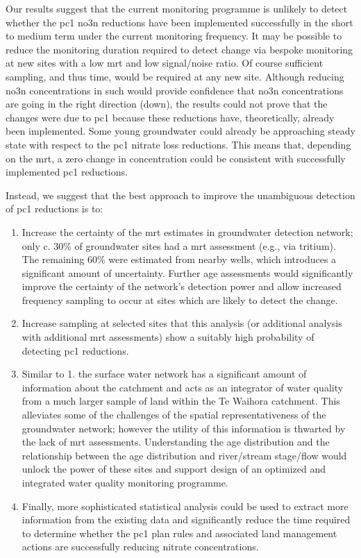 Our results suggest that the current monitoring programme is unlikely to detect whether the \gls{pc1} \gls{no3n} reductions have been implemented successfully in the short to medium term under the current monitoring frequency.
It may be possible to reduce the monitoring duration required to detect change via bespoke monitoring at new sites with a low \gls{mrt} and low signal/noise ratio.
Of course sufficient sampling, and thus time, would be required at any new site.
Although reducing \gls{no3n} concentrations in such would provide confidence that \gls{no3n} concentrations are going in the right direction (down), the results could not prove that the changes were due to \gls{pc1} because these reductions have, theoretically, already been implemented.
Some young groundwater could already be approaching steady state with respect to the \gls{pc1} nitrate loss reductions.
This means that, depending on the \gls{mrt}, a zero change in concentration could be consistent with successfully implemented \gls{pc1} reductions.

Instead, we suggest that the best approach to improve the unambiguous detection of \gls{pc1} reductions is to:
\begin{enumerate}
    \item Increase the certainty of the \gls{mrt} estimates in groundwater detection network; only c. 30\% of groundwater sites had a \gls{mrt} assessment (e.g., via tritium). The remaining 60\% were estimated from nearby wells, which introduces a significant amount of uncertainty. Further age assessments would significantly improve the certainty of the network's detection power and allow increased frequency sampling to occur at sites which are likely to detect the change.
    \item Increase sampling at selected sites that this analysis (or additional analysis with additional \gls{mrt} assessments) show a suitably high probability of detecting \gls{pc1} reductions.
    \item Similar to 1. the surface water network has a significant amount of information about the catchment and acts as an integrator of water quality from a much larger sample of land within the Te Waihora catchment. This alleviates some of the challenges of the spatial representativeness of the groundwater network\citep{olw_guidance}; however the utility of this information is thwarted by the lack of \gls{mrt} assessments. Understanding the age distribution and the relationship between the age distribution and river/stream stage/flow would unlock the power of these sites and support design of an optimized and integrated water quality monitoring programme.
    \item Finally, more sophisticated statistical analysis could be used to extract more information from the existing data and significantly reduce the time required to determine whether the \gls{pc1} plan rules and associated land management actions are successfully reducing nitrate concentrations.
\end{enumerate}

